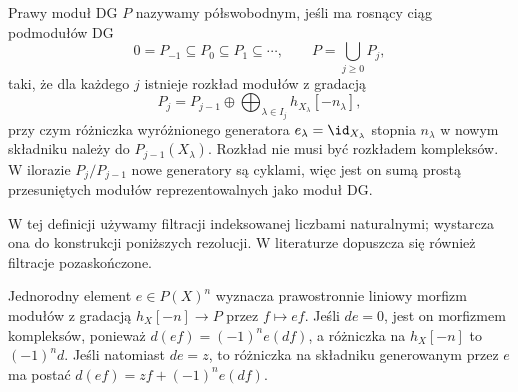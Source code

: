 \begin{definicja}\label{cat:def:dg-semifree}
Prawy moduł DG $P$ nazywamy półswobodnym, jeśli ma rosnący ciąg podmodułów DG
\[
 0=P_{-1}\subseteq P_0\subseteq P_1\subseteq\cdots,
 \qquad P=\bigcup_{j\geq0}P_j,
\]
taki, że dla każdego $j$ istnieje rozkład modułów z gradacją
\[
 P_j=P_{j-1}\oplus\bigoplus_{\lambda\in I_j} h_{X_\lambda}[-n_\lambda],
\]
przy czym różniczka wyróżnionego generatora $e_\lambda=\id_{X_\lambda}$ stopnia $n_\lambda$ w nowym składniku należy do $P_{j-1}(X_\lambda)$. Rozkład nie musi być rozkładem kompleksów. W ilorazie $P_j/P_{j-1}$ nowe generatory są cyklami, więc jest on sumą prostą przesuniętych modułów reprezentowalnych jako moduł DG.
\end{definicja}

W tej definicji używamy filtracji indeksowanej liczbami naturalnymi; wystarcza ona do konstrukcji poniższych rezolucji. W literaturze dopuszcza się również filtracje pozaskończone.

Jednorodny element $e\in P(X)^n$ wyznacza prawostronnie liniowy morfizm modułów z gradacją $h_X[-n]\to P$ przez $f\mapsto ef$. Jeśli $de=0$, jest on morfizmem kompleksów, ponieważ $d(ef)=(-1)^ne(df)$, a różniczka na $h_X[-n]$ to $(-1)^nd$. Jeśli natomiast $de=z$, to różniczka na składniku generowanym przez $e$ ma postać $d(ef)=zf+(-1)^ne(df)$.

